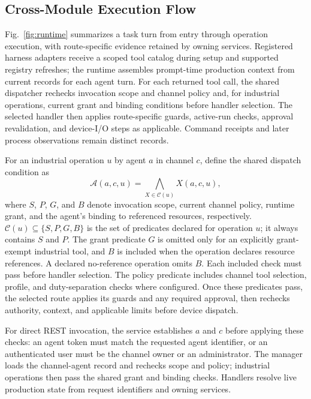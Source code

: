 \subsection{Cross-Module Execution Flow}
\label{sec:executionflow}
Fig.~\ref{fig:runtime} summarizes a task turn from entry through operation
execution, with route-specific evidence retained by owning services. Registered
harness adapters receive a scoped tool catalog during setup and supported
registry refreshes; the runtime assembles prompt-time production context from
current records for each agent turn. For each returned tool call, the shared dispatcher rechecks
invocation scope and channel policy and, for industrial operations, current
grant and binding conditions before handler selection. The selected handler
then applies route-specific guards, active-run checks, approval
revalidation, and device-I/O steps as applicable. Command receipts and later
process observations remain distinct records.

For an industrial operation $u$ by agent $a$ in channel $c$, define the
shared dispatch condition as
\begin{equation}
\mathcal{A}(a,c,u)=\bigwedge_{X\in\mathcal{C}(u)}X(a,c,u),
\label{eq:dispatch-contract}
\end{equation}
where $S$, $P$, $G$, and $B$ denote invocation scope, current channel policy,
runtime grant, and the agent's binding to referenced resources, respectively.
$\mathcal{C}(u)\subseteq\{S,P,G,B\}$ is the set of predicates declared for
operation $u$; it always contains $S$ and $P$. The grant predicate $G$ is
omitted only for an explicitly grant-exempt industrial tool, and $B$ is
included when the operation declares resource references. A declared
no-reference operation omits $B$. Each included check must pass before
handler selection. The policy predicate includes channel tool selection,
profile, and duty-separation checks where configured. Once these predicates
pass, the selected route applies its guards and any required approval, then rechecks
authority, context, and applicable limits before device dispatch.

For direct REST invocation, the service establishes $a$ and $c$ before applying
these checks: an agent token must match the requested agent identifier, or an
authenticated user must be the channel owner or an administrator. The manager
loads the channel-agent record and rechecks scope and policy; industrial
operations then pass the shared grant and binding checks. Handlers resolve live
production state from request identifiers and owning services.

